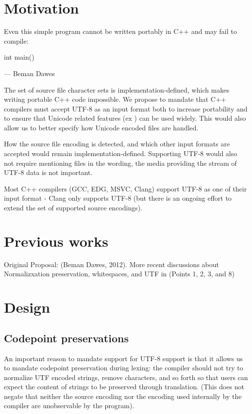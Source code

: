 \documentclass{wg21}
\begin{document}
\section{Motivation}

\begin{quoteblock}
    Even this simple program cannot be written portably in C++ and may fail to compile:
\begin{codeblock}
    int main() {}
\end{codeblock}
 --- Beman Dawes
\end{quoteblock}

The set of source file character sets is implementation-defined, which makes writing portable C++ code impossible.
We propose to mandate that C++ compilers must accept UTF-8 as an input format both to increase portability and
to ensure that Unicode related features (ex ) can be used widely.
This would also allow us to better specify how Unicode encoded files are handled.

How the source file encoding is detected, and which other input formats are accepted would remain implementation-defined.
Supporting UTF-8 would also not require mentioning files in the wording, the media providing the stream of UTF-8 data is not important.

Most C++ compilers (GCC, EDG, MSVC, Clang) support UTF-8 as one of their input format - Clang only supports UTF-8 (but there is an ongoing effort to extend the set of supported
source encodings).

\section{Previous works}

Original Proposal:  (Beman Dawes, 2012).
More recent discussions about Normalizxation preservation, whitespaces, and UTF in  (Points 1, 2, 3, and 8)

\section{Design}

\subsection{Codepoint preservations}

An important reason to mandate support for UTF-8 support is that it allows us to mandate codepoint preservation during lexing:
the compiler should not try to normalize UTF encoded strings, remove characters, and so forth so that users can expect the content
of strings to be preserved through translation.
(This does not negate that neither the source encoding nor the encoding used internally by the compiler are unobservable by the program).
\end{document}

